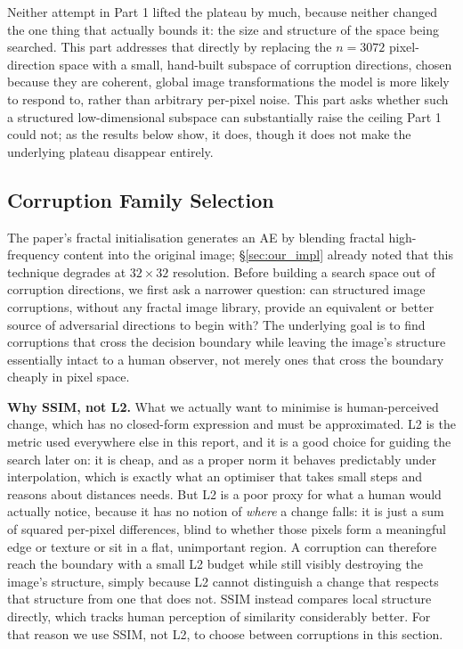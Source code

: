\documentclass[11pt, a4paper]{article}
\begin{document}
Neither attempt in Part 1 lifted the plateau by much, because neither changed the one thing that actually bounds it: the size and structure of the space being searched. This part addresses that directly by replacing the $n=3072$ pixel-direction space with a small, hand-built subspace of corruption directions, chosen because they are coherent, global image transformations the model is more likely to respond to, rather than arbitrary per-pixel noise. This part asks whether such a structured low-dimensional subspace can substantially raise the ceiling Part 1 could not; as the results below show, it does, though it does not make the underlying plateau disappear entirely.

\subsection{Corruption Family Selection}
\label{sec:corruption_family}

The paper's fractal initialisation generates an AE by blending fractal high-frequency content into the original image; \S\ref{sec:our_impl} already noted that this technique degrades at $32\times32$ resolution. Before building a search space out of corruption directions, we first ask a narrower question: can structured image corruptions, without any fractal image library, provide an equivalent or better source of adversarial directions to begin with? The underlying goal is to find corruptions that cross the decision boundary while leaving the image's structure essentially intact to a human observer, not merely ones that cross the boundary cheaply in pixel space.

\textbf{Why SSIM, not L2.} What we actually want to minimise is human-perceived change, which has no closed-form expression and must be approximated. L2 is the metric used everywhere else in this report, and it is a good choice for guiding the search later on: it is cheap, and as a proper norm it behaves predictably under interpolation, which is exactly what an optimiser that takes small steps and reasons about distances needs. But L2 is a poor proxy for what a human would actually notice, because it has no notion of \emph{where} a change falls: it is just a sum of squared per-pixel differences, blind to whether those pixels form a meaningful edge or texture or sit in a flat, unimportant region. A corruption can therefore reach the boundary with a small L2 budget while still visibly destroying the image's structure, simply because L2 cannot distinguish a change that respects that structure from one that does not. SSIM instead compares local structure directly, which tracks human perception of similarity considerably better. For that reason we use SSIM, not L2, to choose between corruptions in this section.
\end{document}
